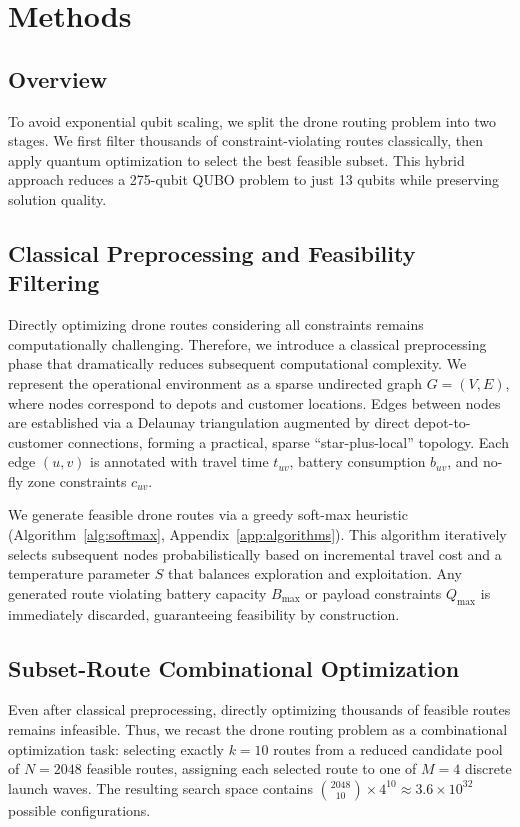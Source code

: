 \section{Methods}

\subsection{Overview}

To avoid exponential qubit scaling, we split the drone routing problem into two stages. We first filter thousands of constraint-violating routes classically, then apply quantum optimization to select the best feasible subset. This hybrid approach reduces a 275-qubit QUBO problem to just 13 qubits while preserving solution quality.

\subsection{Classical Preprocessing and Feasibility Filtering}

Directly optimizing drone routes considering all constraints remains computationally challenging. Therefore, we introduce a classical preprocessing phase that dramatically reduces subsequent computational complexity. We represent the operational environment as a sparse undirected graph $G=(V,E)$, where nodes correspond to depots and customer locations. Edges between nodes are established via a Delaunay triangulation augmented by direct depot-to-customer connections, forming a practical, sparse ``star-plus-local'' topology. Each edge $(u,v)$ is annotated with travel time $t_{uv}$, battery consumption $b_{uv}$, and no-fly zone constraints $c_{uv}$.

We generate feasible drone routes via a greedy soft-max heuristic (Algorithm~\ref{alg:softmax}, Appendix~\ref{app:algorithms}). This algorithm iteratively selects subsequent nodes probabilistically based on incremental travel cost and a temperature parameter $S$ that balances exploration and exploitation. Any generated route violating battery capacity $B_{\max}$ or payload constraints $Q_{\max}$ is immediately discarded, guaranteeing feasibility by construction.

\subsection{Subset-Route Combinational Optimization}

Even after classical preprocessing, directly optimizing thousands of feasible routes remains infeasible. Thus, we recast the drone routing problem as a combinational optimization task: selecting exactly $k=10$ routes from a reduced candidate pool of $N=2048$ feasible routes, assigning each selected route to one of $M=4$ discrete launch waves. The resulting search space contains $\binom{2048}{10} \times 4^{10} \approx 3.6 \times 10^{32}$ possible configurations.

